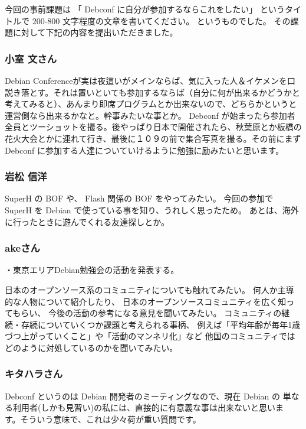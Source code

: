 \documentclass[mingoth,a4paper]{jsarticle}
\begin{document}
今回の事前課題は
「 Debconf に自分が参加するならこれをしたい」
というタイトルで 200-800 文字程度の文章を書いてください。
というものでした。
その課題に対して下記の内容を提出いただきました。

\subsubsection{小室 文さん}

Debian Conferenceが実は夜這いがメインならば、気に入った人＆イケメンを口
説き落とす。それは置いといても参加するならば（自分に何が出来るかどうかと
考えてみると）、あんまり即席プログラムとか出来ないので、どちらかというと
運営側なら出来るかなと。幹事みたいな事とか。 Debconf が始まったら参加者
全員とツーショットを撮る。後やっぱり日本で開催されたら、秋葉原とか板橋の
花火大会とかに連れて行き、最後に１０９の前で集合写真を撮る。その前にまず
Debconf に参加する人達についていけるように勉強に励みたいと思います。

\subsubsection{岩松 信洋}

SuperH の BOF や、 Flash 関係の BOF をやってみたい。
今回の参加で SuperH を Debian で使っている事を知り、うれしく思ったため。
あとは、海外に行ったときに遊んでくれる友達探しとか。

\subsubsection{akeさん}

・東京エリアDebian勉強会の活動を発表する。

日本のオープンソース系のコミュニティについても触れてみたい。
何人か主導的な人物について紹介したり、
日本のオープンソースコミュニティを広く知ってもらい、
今後の活動の参考になる意見を聞いてみたい。
コミュニティの継続・存続についていくつか課題と考えられる事柄、
例えば「平均年齢が毎年1歳づつ上がっていくこと」や「活動のマンネリ化」など
他国のコミュニティではどのように対処しているのかを聞いてみたい。

\subsubsection{キタハラさん}

    Debconf というのは Debian 開発者のミーティングなので、現在 Debian の
単なる利用者(しかも見習い)の私には、直接的に有意義な事は出来ないと思いま
す。そういう意味で、これは少々荷が重い質問です。
\end{document}
